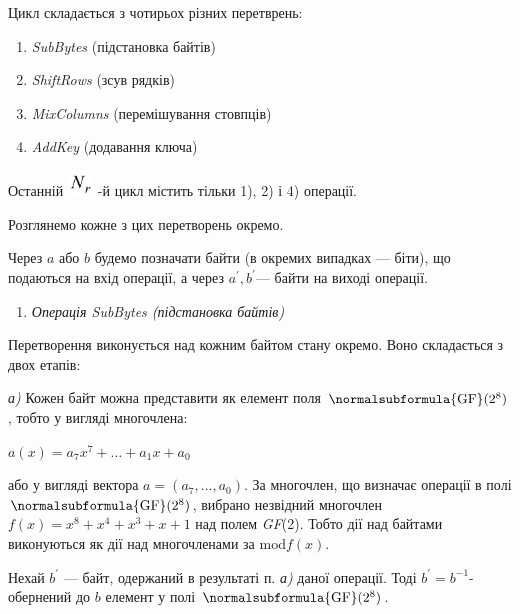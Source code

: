 \bigskip


\bigskip

Цикл складається з чотирьох різних перетврень:

\liststyleWWviiiNumiv
\begin{enumerate}
\item \textit{SubBytes} (підстановка байтів)
\item \textit{ShiftRows} (зсув рядків)
\item \textit{MixColumns }(перемішування стовпців)
\item \textit{AddKey} (додавання ключа)
\end{enumerate}
Останній 
\includegraphics[width=0.2638in,height=0.2638in]{crypt-img/crypt-img329.png}
{}-й цикл містить тільки 1), 2) і 4) операції.

Розглянемо кожне з цих перетворень окремо. 

Через  ${a}$ або  ${b}$ будемо позначати байти (в окремих випадках --- біти), що
подаються на вхід операції, а через  ${{a}^{'},{b}^{'}}$--- байти на виході
операції.


\bigskip

\liststyleWWviiiNumxxxi
\begin{enumerate}
\item {\itshape
Операція SubBytes (підстановка байтів)}
\end{enumerate}

\bigskip

Перетворення виконується над кожним байтом стану окремо. Воно складається з двох
етапів:

\textit{а)} Кожен байт можна представити як елемент поля 
${\normalsubformula{\text{GF}}(2^{{8}})}$, тобто у вигляді многочлена:

{\centering 
${a(x)=a_{{7}}x^{{7}}+\dots+a_{{1}}x+a_{{0}}}$\par}

або у вигляді вектора  ${a=(a_{{7}},\dots,a_{{0}})}$. За
многочлен, що визначає операції в полі 
${\normalsubformula{\text{GF}}(2^{{8}})}$, вибрано незвідний многочлен 
${f(x)=x^{{8}}+x^{{4}}+x^{{3}}+x+1}$ над полем \textit{GF}(2). Тобто  дії над
байтами виконуються як дії над многочленами за  ${\text{mod}f(x)}$.

Нехай  ${{b}^{'}}$ --- байт, одержаний в результаті п. \textit{а)}  даної
операції. Тоді  ${{b}^{'}=b^{{-1}}}$\nobreakdash- обернений до  ${b}$ елемент у
полі  ${\normalsubformula{\text{GF}}(2^{{8}})}$. 

